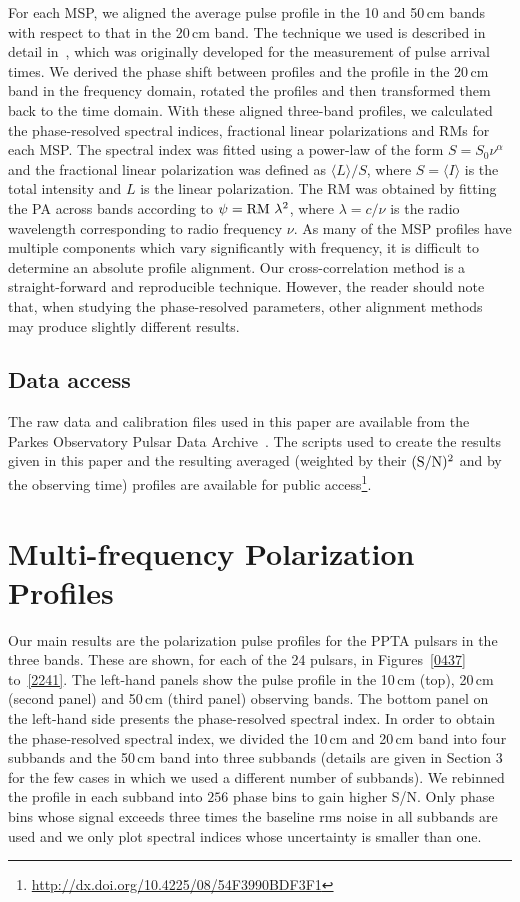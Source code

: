 \documentclass[useAMS,usenatbib]{mn2e}
\begin{document}
For each MSP, we aligned the average pulse profile in the 10 and 50\,cm bands with 
respect to that in the 20\,cm band.
%
The technique we used is described in detail in~\citet{Taylor92}, which 
was originally developed for the measurement of pulse arrival times.
%
We derived the phase shift between profiles and the profile in the 20\,cm band 
in the frequency domain, rotated the profiles and then transformed them back to 
the time domain.
%
With these aligned three-band profiles, we calculated the phase-resolved 
spectral indices, fractional linear polarizations and RMs for each MSP. 
%
The spectral index was fitted using a power-law of the form $S=S_{0}\nu^{\alpha}$ 
and the fractional linear polarization was defined as $\langle L \rangle/S$, 
where $S=\langle I\rangle$ is the total intensity and $L$ is the linear polarization.
%
The RM was obtained by fitting the PA across bands according to $\psi=\rm{RM}\ \lambda^{2}$,
where $\lambda=c/\nu$ is the radio wavelength corresponding to radio 
frequency $\nu$.
%
As many of the MSP profiles have multiple components which vary significantly with frequency, 
it is difficult to determine an absolute profile alignment. Our cross-correlation 
method is a straight-forward and reproducible technique. However, the reader should 
note that, when studying the phase-resolved parameters, other alignment methods 
may produce slightly different results.

\subsection{Data access}

The raw data and calibration files used in this paper are available from the 
Parkes Observatory Pulsar Data Archive~\citep{Hobbs11}.  
%
The scripts used to create the results given in this paper and the resulting averaged 
(weighted by their $(\rm{S/N})^2$ and by the observing time) profiles are available for 
public access\footnote{\url{http://dx.doi.org/10.4225/08/54F3990BDF3F1}}.


\section{Multi-frequency Polarization Profiles}

Our main results are the polarization pulse profiles for the PPTA pulsars in the three bands.  
These are shown, for each of the 24 pulsars, in Figures~\ref{0437} to~\ref{2241}. 
%
The left-hand panels show the pulse profile in the 10\,cm (top), 20\,cm (second panel) and 
50\,cm (third panel) observing bands. 
The bottom panel on the left-hand side presents the phase-resolved spectral index.   
%
In order to obtain the phase-resolved spectral index, we divided the 10\,cm and 20\,cm band 
into four subbands and the 50\,cm band into three subbands (details are given in Section 3 for the few cases in which we used a different number of subbands).
We rebinned the profile in each subband into $256$ phase bins to gain higher S/N. Only 
phase bins whose signal exceeds three times the baseline rms noise in all subbands 
are used and we only plot spectral indices whose uncertainty is smaller than one. 
%
\end{document}
